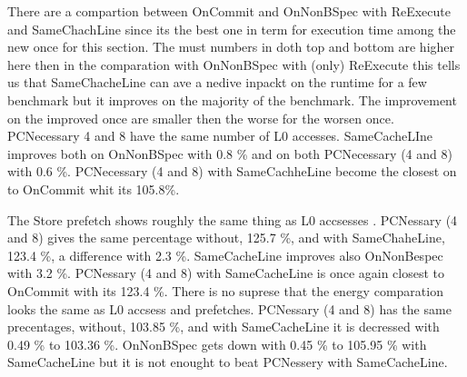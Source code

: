 There are a compartion between OnCommit and OnNonBSpec with ReExecute and SameChachLine since its the best one in term for execution time among the new once for this section. The must numbers in doth top and bottom are higher here then in the comparation with OnNonBSpec with (only) ReExecute this tells us that SameChacheLine can ave a nedive inpackt on the runtime for a few benchmark but it improves on the majority of the benchmark. The improvement on the improved once are smaller then the worse for the worsen once. 
\resAcc
{}
PCNecessary 4 and 8 have the same number of L0 accesses. SameCacheLIne improves both on OnNonBSpec with 0.8 \% and on both PCNecessary (4 and 8) with 0.6 \%. PCNecessary (4 and 8) with SameCachheLine become the closest on to OnCommit whit its 105.8\%.

\resSp
{}
The Store prefetch shows roughly the same thing as L0 accsesses \fixme. PCNessary (4 and 8) gives the same percentage without, 125.7 \%, and with SameChaheLine, 123.4 \%, a difference with 2.3 \%. SameCacheLine improves also OnNonBespec with 3.2 \%. PCNessary (4 and 8) with SameCacheLine is once again closest to OnCommit with its 123.4 \%.   
\resEnergy
{}
There is no suprese that the energy comparation looks the same as L0 accsess and prefetches. PCNessary (4 and 8) has the same precentages, without, 103.85 \%, and with SameCacheLine it is decressed with 0.49 \% to 103.36 \%. OnNonBSpec gets down with 0.45 \% to 105.95 \% with SameCacheLine but it is not enought to beat PCNessery with SameCacheLine.

